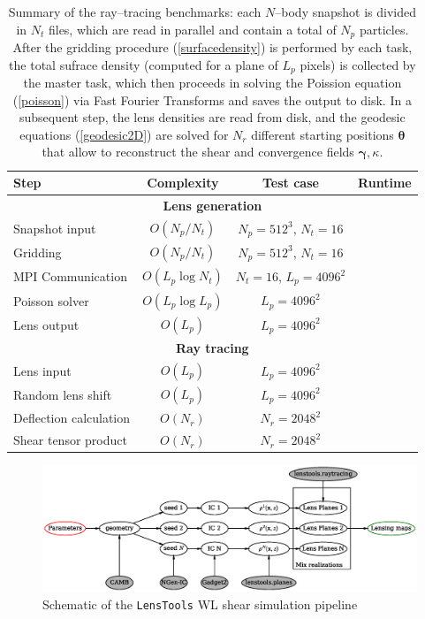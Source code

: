 \documentclass[reprint,aps,prd,superscriptaddress,showkeys,showpacs]{revtex4-1}
\newcommand{\LT}{\texttt{LensTools} }
\begin{document}
\begin{table}
\begin{tabular}{l|c|c|c}
\toprule
{Step} &            Complexity &            Test case &           Runtime \\ \hline \hline
\midrule
\multicolumn{4}{c}{\textbf{Lens generation}} \\ \hline
Snapshot input & $O(N_p/N_t)$  & $N_p=512^3$, $N_t=16$  &  \\
Gridding        & $O(N_p/N_t)$   & $N_p=512^3$, $N_t=16$  &  \\
MPI Communication  & $O(L_p\log{N_t})$   & $N_t=16$, $L_p=4096^2$  &   \\
Poisson solver           & $O(L_p\log{L_p})$ & $L_p=4096^2$  &      \\
Lens output           & $O(L_p)$ & $L_p=4096^2$   &   \\ \hline \hline

\multicolumn{4}{c}{\textbf{Ray tracing}} \\ \hline
Lens input &  $O(L_p)$ & $L_p=4096^2$ &  \\
Random lens shift &  $O(L_p)$ & $L_p=4096^2$ &  \\
Deflection calculation        &  $O(N_r)$ & $N_r=2048^2$   &  \\
Shear tensor product               &  $O(N_r)$ & $N_r=2048^2$   &   \\ \hline \hline

\bottomrule
\end{tabular}
\caption{Summary of the ray--tracing benchmarks: each $N$--body snapshot is divided in $N_t$ files, which are read in parallel and contain a total of $N_p$ particles. After the gridding procedure (\ref{surfacedensity}) is performed by each task, the total sufrace density (computed for a plane of $L_p$ pixels) is collected by the master task, which then proceeds in solving the Poission equation (\ref{poisson}) via Fast Fourier Transforms and saves the output to disk. In a subsequent step, the lens densities are read from disk, and the geodesic equations (\ref{geodesic2D}) are solved for $N_r$ different starting positions $\pmb{\theta}$ that allow to reconstruct the shear and convergence fields $\pmb{\gamma},\kappa$.}
\label{benchmarktable}
\end{table}

\begin{figure}
\includegraphics[scale=0.6]{Figures/flow.eps}
\caption{Schematic of the \LT WL shear simulation pipeline}
\label{pipescheme}
\end{figure}
\end{document}
